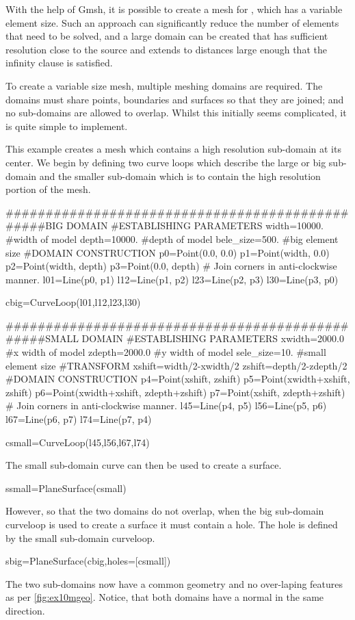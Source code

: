 With the help of Gmsh, it is possible to create a mesh for \esc, which has a
variable element size. Such an approach can significantly reduce the number of
elements that need to be solved, and a large domain can be created that has
sufficient resolution close to the source and extends to distances large enough
that the infinity clause is satisfied.

To create a variable size mesh, multiple meshing domains are required. The
domains must share points, boundaries and surfaces so that they are joined; and
no sub-domains are allowed to overlap. Whilst this initially seems complicated,
it is quite simple to implement. 

This example creates a mesh which contains a high resolution sub-domain at its
center. We begin by defining two curve loops which describe the large or
big sub-domain and the smaller sub-domain which is to contain the high
resolution portion of the mesh. 
\begin{python}
################################################BIG DOMAIN
#ESTABLISHING PARAMETERS
width=10000.    #width of model
depth=10000.    #depth of model
bele_size=500.  #big element size
#DOMAIN CONSTRUCTION
p0=Point(0.0,    0.0)
p1=Point(width, 0.0)
p2=Point(width, depth)
p3=Point(0.0,   depth)
# Join corners in anti-clockwise manner.
l01=Line(p0, p1)
l12=Line(p1, p2)
l23=Line(p2, p3)
l30=Line(p3, p0)

cbig=CurveLoop(l01,l12,l23,l30)

################################################SMALL DOMAIN
#ESTABLISHING PARAMETERS
xwidth=2000.0   #x width of model
zdepth=2000.0   #y width of model
sele_size=10.   #small element size
#TRANSFORM
xshift=width/2-xwidth/2
zshift=depth/2-zdepth/2
#DOMAIN CONSTRUCTION
p4=Point(xshift, zshift)
p5=Point(xwidth+xshift, zshift)
p6=Point(xwidth+xshift, zdepth+zshift)
p7=Point(xshift,    zdepth+zshift)
# Join corners in anti-clockwise manner.
l45=Line(p4, p5)
l56=Line(p5, p6)
l67=Line(p6, p7)
l74=Line(p7, p4)

csmall=CurveLoop(l45,l56,l67,l74)
\end{python}
The small sub-domain curve can then be used to create a surface.
\begin{python}
ssmall=PlaneSurface(csmall)
\end{python}
However, so that the two domains do not overlap, when the big sub-domain
curveloop is used to create a surface it must contain a hole. The hole is
defined by the small sub-domain curveloop.
\begin{python}
sbig=PlaneSurface(cbig,holes=[csmall])
\end{python}
The two sub-domains now have a common geometry and no over-laping features as
per \autoref{fig:ex10mgeo}. Notice, that both domains have a normal in the
same direction.

